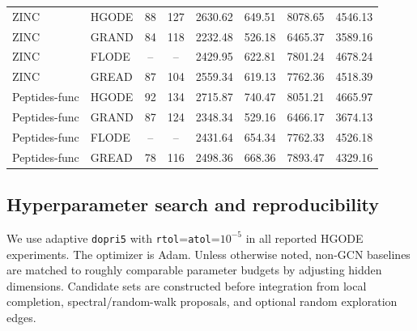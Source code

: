 \documentclass{article}
\theoremstyle{plain}
\theoremstyle{definition}
\theoremstyle{remark}
\begin{document}
\begin{table}[H]
{\begin{tabular}{llccrrrr}
            ZINC          & HGODE & 88                      & 127                           & 2630.62                         & 649.51 & 8078.65 & 4546.13 \\
            ZINC          & GRAND & 84                      & 118                           & 2232.48                         & 526.18 & 6465.37 & 3589.16 \\
            ZINC          & FLODE & --                      & --                            & 2429.95                         & 622.81 & 7801.24 & 4678.24 \\
            ZINC          & GREAD & 87                      & 104                           & 2559.34                         & 619.13 & 7762.36 & 4518.39 \\
            \midrule
            Peptides-func & HGODE & 92                      & 134                           & 2715.87                         & 740.47 & 8051.21 & 4665.97 \\
            Peptides-func & GRAND & 87                      & 124                           & 2348.34                         & 529.16 & 6466.17 & 3674.13 \\
            Peptides-func & FLODE & --                      & --                            & 2431.64                         & 654.34 & 7762.33 & 4526.18 \\
            Peptides-func & GREAD & 78                      & 116                           & 2498.36                         & 668.36 & 7893.47 & 4329.16 \\
            \bottomrule
        \end{tabular}}
\end{table}

\subsection{Hyperparameter search and reproducibility}
\label{app:reproducibility}

We use adaptive \texttt{dopri5} with \texttt{rtol}=\texttt{atol}=$10^{-5}$ in
all reported HGODE experiments. The optimizer is Adam. Unless otherwise noted,
non-GCN baselines are matched to roughly comparable parameter budgets by
adjusting hidden dimensions. Candidate sets are constructed before integration
from local completion, spectral/random-walk proposals, and optional random
exploration edges.
\end{document}
